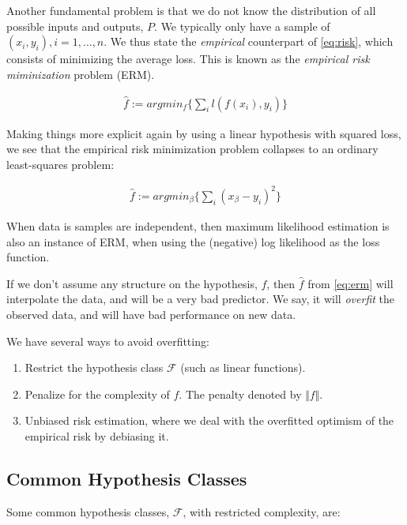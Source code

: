 \documentclass[]{book}
\providecommand{\tightlist}{%
  \setlength{\itemsep}{0pt}\setlength{\parskip}{0pt}}
\theoremstyle{definition}
\theoremstyle{definition}
\theoremstyle{remark}
\begin{document}
Another fundamental problem is that we do not know the distribution of
all possible inputs and outputs, \(P\). We typically only have a sample
of \((x_i,y_i), i=1,\dots,n\). We thus state the \emph{empirical}
counterpart of \eqref{eq:risk}, which consists of minimizing the average
loss. This is known as the \emph{empirical risk miminization} problem
(ERM).

\begin{align}
  \hat f := argmin_f \{ \sum_i l(f(x_i),y_i) \}
  \label{eq:erm}  
\end{align}

Making things more explicit again by using a linear hypothesis with
squared loss, we see that the empirical risk minimization problem
collapses to an ordinary least-squares problem:

\begin{align}
  \hat f := argmin_\beta \{ \sum_i (x_\beta-y_i)^2 \}
\end{align}

When data is samples are independent, then maximum likelihood estimation
is also an instance of ERM, when using the (negative) log likelihood as
the loss function.

If we don't assume any structure on the hypothesis, \(f\), then
\(\hat f\) from \eqref{eq:erm} will interpolate the data, and will be a
very bad predictor. We say, it will \emph{overfit} the observed data,
and will have bad performance on new data.

We have several ways to avoid overfitting:

\begin{enumerate}
\def\labelenumi{\arabic{enumi}.}
\tightlist
\item
  Restrict the hypothesis class \(\mathcal{F}\) (such as linear
  functions).
\item
  Penalize for the complexity of \(f\). The penalty denoted by
  \(\Vert f \Vert\).
\item
  Unbiased risk estimation, where we deal with the overfitted optimism
  of the empirical risk by debiasing it.
\end{enumerate}

\subsection{Common Hypothesis Classes}\label{common-hypothesis-classes}

Some common hypothesis classes, \(\mathcal{F}\), with restricted
complexity, are:
\end{document}

